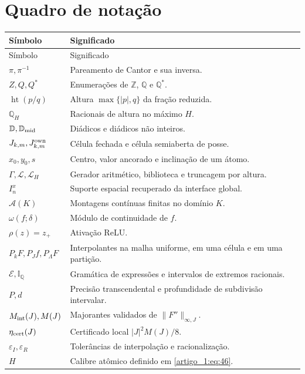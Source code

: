 \documentclass[12pt,a4paper]{article}
\theoremstyle{preciso}
\theoremstyle{definition}
\newcommand{\Z}{\mathbb Z}
\newcommand{\Q}{\mathbb Q}
\newcommand{\D}{\mathbb D}
\newcommand{\LL}{\mathcal L}
\newcommand{\Asm}{\mathcal A}
\newcommand{\EE}{\mathcal E}
\newcommand{\heightq}{\operatorname{ht}}
\theoremstyle{preciso}
\theoremstyle{preciso}
\theoremstyle{preciso}
\theoremstyle{preciso}
\theoremstyle{definition}
\theoremstyle{preciso}
\theoremstyle{definition}
\theoremstyle{preciso}
\theoremstyle{preciso}
\theoremstyle{definition}
\begin{document}
\section{Quadro de notação}
\footnotesize
\renewcommand{\arraystretch}{1.1}
\begin{longtable}{@{}p{.28\linewidth}p{.68\linewidth}@{}}
\toprule Símbolo&Significado\\\midrule
\endfirsthead
\toprule Símbolo&Significado\\\midrule
\endhead
\bottomrule\endfoot
$\pi,\pi^{-1}$&Pareamento de Cantor e sua inversa.\\
$Z,Q,Q^*$&Enumerações de $\Z$, $\Q$ e $\Q^*$.\\
$\heightq(p/q)$&Altura $\max\{|p|,q\}$ da fração reduzida.\\
$\Q_H$&Racionais de altura no máximo $H$.\\
$\D,\D_{\rm mid}$&Diádicos e diádicos não inteiros.\\
$J_{k,m},J_{k,m}^{\rm own}$&Célula fechada e célula semiaberta de posse.\\
$x_0,y_0,s$&Centro, valor ancorado e inclinação de um átomo.\\
$\Gamma,\LL,\LL_H$&Gerador aritmético, biblioteca e truncagem por altura.\\
$I_n^x$&Suporte espacial recuperado da interface global.\\
$\Asm(K)$&Montagens contínuas finitas no domínio $K$.\\
$\omega(f;\delta)$&Módulo de continuidade de $f$.\\
$\rho(z)=z_+$&Ativação ReLU.\\
$P_kF,P_Jf,P_\Lambda F$&Interpolantes na malha uniforme, em uma célula e em uma partição.\\
$\EE,\mathbb I_{\Q}$&Gramática de expressões e intervalos de extremos racionais.\\
$P,d$&Precisão transcendental e profundidade de subdivisão intervalar.\\
$M_{\rm int}(J),M(J)$&Majorantes validados de $\|F''\|_{\infty,J}$.\\
$\eta_{\rm cert}(J)$&Certificado local $|J|^2M(J)/8$.\\
$\varepsilon_I,\varepsilon_R$&Tolerâncias de interpolação e racionalização.\\
$H$&Calibre atômico definido em \eqref{artigo_1:eq:46}.\\
\end{longtable}
\normalsize
\end{document}
